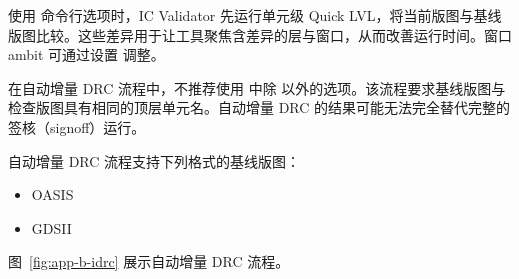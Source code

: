 使用  命令行选项时，IC Validator 先运行单元级 Quick LVL，将当前版图与基线版图比较。这些差异用于让工具聚焦含差异的层与窗口，从而改善运行时间。窗口 ambit 可通过设置  调整。

在自动增量 DRC 流程中，不推荐使用  中除  以外的选项。该流程要求基线版图与检查版图具有相同的顶层单元名。自动增量 DRC 的结果可能无法完全替代完整的签核（signoff）运行。

自动增量 DRC 流程支持下列格式的基线版图：
\begin{itemize}
  \item OASIS
  \item GDSII
\end{itemize}

图~\ref{fig:app-b-idrc} 展示自动增量 DRC 流程。

